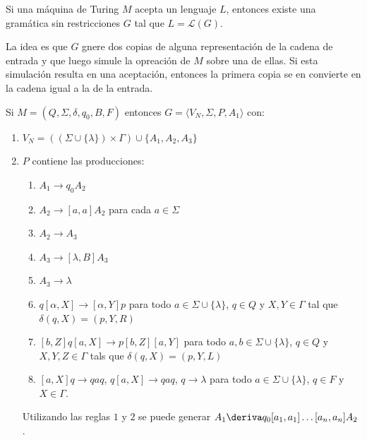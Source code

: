 \begin{teorema}
  Si una máquina de Turing \(M\) acepta un lenguaje \(L\), entonces existe una gramática sin restricciones \(G\) tal que \(L = \mathcal{L}(G)\).
\end{teorema}
\begin{demo}[0.8\textwidth]
  La idea es que \(G\) gnere dos copias de alguna representación de la cadena de entrada y que luego simule la opreación de \(M\) sobre una de ellas. Si esta simulación resulta en una aceptación, entonces la primera copia se en convierte en la cadena igual a la de la entrada.

  Si \(M=(Q, \Sigma, \delta, q_0, B, F)\) entonces \(G = \langle V_N, \Sigma, P, A_1 \rangle\) con:
  \begin{enumerate}
    \item \(V_N = ((\Sigma\cup\{\lambda\})\times\Gamma)\cup\{A_1,A_2,A_3\}\)
    \item \(P\) contiene las producciones:
          \begin{enumerate}
            \item \(A_1 \to q_0A_2\)
            \item \(A_2 \to [a,a]A_2\) para cada \(a\in\Sigma\)
            \item \(A_2\to A_3\)
            \item \(A_3\to [\lambda, B]A_3\)
            \item \(A_3\to\lambda\)
            \item \(q[\alpha,X]\to[\alpha, Y]p\) para todo \(a\in\Sigma\cup\{\lambda\}\), \(q\in Q\) y \(X,Y\in\Gamma\) tal que \(\delta(q,X) = (p, Y, R)\)
            \item \([b,Z]q[a,X]\to p[b,Z][a,Y]\) para todo \(a,b\in\Sigma\cup\{\lambda\}\), \(q\in Q\) y \(X, Y, Z\in\Gamma\) tals que \(\delta(q, X) = (p, Y, L)\)
            \item \([a,X]q\to qaq\), \(q[a,X]\to qaq\), \(q\to\lambda\) para todo \(a\in\Sigma\cup\{\lambda\}\), \(q\in F\) y \(X\in\Gamma\).
          \end{enumerate}

          Utilizando las reglas \(1\) y \(2\) se puede generar \(A_1 \deriva q_0[a_1, a_1]\dots[a_n, a_n]A_2\).
  \end{enumerate}
\end{demo}
